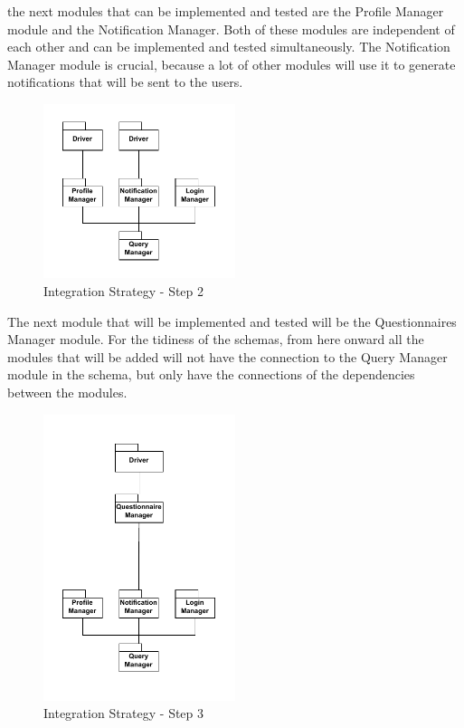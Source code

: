 \par the next modules that can be implemented and tested are the Profile Manager module and the Notification Manager. 
Both of these modules are independent of each other and can be implemented and tested simultaneously.
The Notification Manager module is crucial, because a lot of other modules will use it to generate notifications that
will be sent to the users.

\begin{figure}[H]
    \centering
    \includegraphics[width=0.5\textwidth]{Images/Integ_2.pdf}
    \caption{Integration Strategy - Step 2}
    \label{fig:integration-strategy-step-2}
\end{figure}

\par The next module that will be implemented and tested will be the Questionnaires Manager module.
For the tidiness of the schemas, from here onward all the modules that will be added will not have the connection to the
Query Manager module in the schema, but only have the connections of the dependencies between the modules.

\begin{figure}[H]
    \centering
    \includegraphics[width=0.5\textwidth]{Images/Integ_3.pdf}
    \caption{Integration Strategy - Step 3}
    \label{fig:integration-strategy-step-3}
\end{figure}

